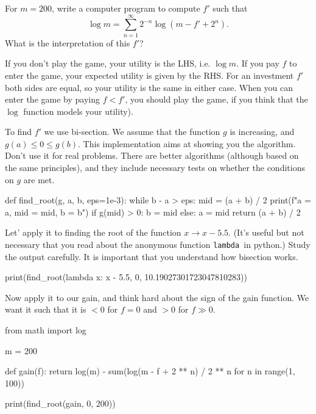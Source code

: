 \documentclass[lectures]{subfiles}
\begin{document}
\begin{exercise}
For $m=200$, write a computer program to compute $f'$ such that
\begin{equation}
  \label{eq:136}
\log m =  \sum_{n=1}^{\infty} 2^{-n}\log(m - f' + 2^{n}).
 \end{equation}
What is the interpretation of this $f'$?
\begin{solution}
  If you don't play the game, your utility is the LHS, i.e. $\log m$.
  If you pay $f$ to enter the game, your expected utility is given by the RHS.
  For an investment $f'$ both sides are equal, so your utility is the same in either case.
  When you can enter the game by paying $f<f'$, you should play the game, if you think that the $\log$ function models your utility).


  To find $f'$ we use bi-section.
  We assume that the function $g$ is increasing, and $g(a) \leq 0 \leq g(b)$.
  This implementation aims at showing you the algorithm.
  Don't use it for real problems.
  There are better algorithms (although based on the same principles), and they include necessary tests on whether the conditions on $g$ are met.

\begin{samepage}
\begin{pyblock}
def find_root(g, a, b, eps=1e-3):
    while b - a > eps:
        mid = (a + b) / 2
        print(f"a = {a}, mid = {mid}, b = {b}\n")
        if g(mid) > 0:
            b = mid
        else:
            a = mid
    return (a + b) / 2
\end{pyblock}
\end{samepage}


Let' apply it to finding the root of the function $x\to x-5.5$.
(It's useful but not necessary that you read about the anonymous function \texttt{lambda }in python.)
Study the output carefully.
It is important that you understand how bisection works.
\begin{pyblock}
print(find_root(lambda x: x - 5.5, 0, 10.19027301723047810283))
\end{pyblock}

\printpythontex

\begin{samepage}

Now apply it to our gain, and think hard about the sign of the gain function. We want it such that it is $<0$ for $f=0$ and $>0$ for $f\gg 0$.
\begin{pyblock}
from math import log

m = 200

def gain(f):
    return log(m) - sum(log(m - f + 2 ** n) / 2 ** n for n in range(1, 100))


print(find_root(gain, 0, 200))
\end{pyblock}

\end{samepage}

\printpythontex

\end{solution}
\end{exercise}
\end{document}
